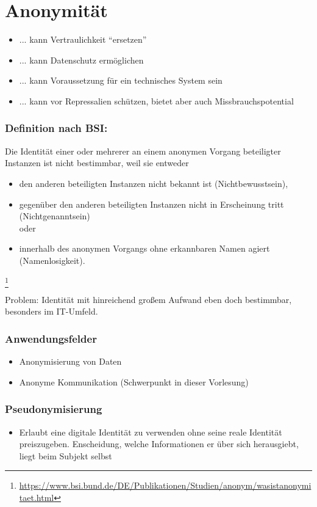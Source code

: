\section{Anonymität}
\begin{itemize}
	\item ... kann Vertraulichkeit "`ersetzen"'
	\item ... kann Datenschutz ermöglichen
	\item ... kann Voraussetzung für ein technisches System sein
	\item ... kann vor Repressalien schützen, bietet aber auch Missbrauchspotential
\end{itemize}

\subsubsection{Definition nach BSI:}
Die Identität einer oder mehrerer an einem anonymen Vorgang beteiligter Instanzen ist nicht bestimmbar, weil sie entweder
\begin{itemize}
	\item den anderen beteiligten Instanzen nicht bekannt ist (Nichtbewusstsein),
	\item gegenüber den anderen beteiligten Instanzen nicht in Erscheinung tritt (Nichtgenanntsein) \\ oder
	\item innerhalb des anonymen Vorgangs ohne erkannbaren Namen agiert (Namenlosigkeit).
\end{itemize}
\footnote{\url{https://www.bsi.bund.de/DE/Publikationen/Studien/anonym/wasistanonymitaet.html}}

Problem: Identität mit hinreichend großem Aufwand eben doch bestimmbar, besonders im IT-Umfeld.

\subsubsection{Anwendungsfelder}
\begin{itemize}
	\item Anonymisierung von Daten
	\item Anonyme Kommunikation (Schwerpunkt in dieser Vorlesung)
\end{itemize}

\subsubsection{Pseudonymisierung}
\begin{itemize}
	\item Erlaubt eine digitale Identität zu verwenden ohne seine reale Identität preiszugeben. Enscheidung, welche Informationen er über sich herausgiebt, liegt beim Subjekt selbst
\end{itemize}

